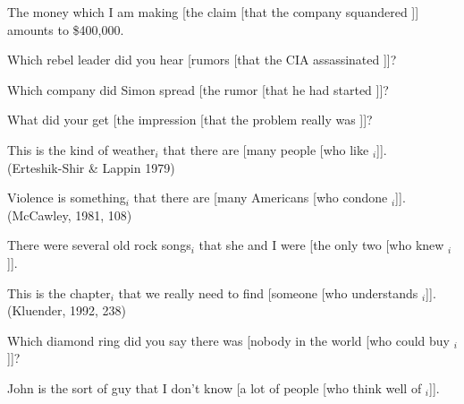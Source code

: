 \documentclass[output=paper]{langsci/langscibook}
\begin{document}

\ea \label{csubok}
\ea The money which I am making [the claim [that the company squandered \spc]] amounts to \$400,000.\\
 \citep[206, 207]{pollardsag}

\item  Which rebel leader did you hear [rumors [that the CIA assassinated \spc]]?
\item Which company did Simon spread [the rumor [that he had started \spc]]?
\item What did your get [the impression [that the problem really was \spc]]?\\
\citep{kluender}
\z
\z


\ea \label{csubok2}
\ea This is the kind of weather$_i$ that there are [many people [who like \spc$_i$]].\\
(Erteshik-Shir \& Lappin 1979)

\item Violence is something$_i$ that there are [many Americans [who condone \spc$_i$]].\\
(McCawley, 1981, 108)

\item There were several old rock songs$_i$ that she and I were [the only two [who
knew \spc$_i$]].\\
\citep{chungmc}

\item This is the chapter$_i$ that we really need to find [someone [who understands \spc$_i$]].\\
(Kluender, 1992, 238)

\item Which diamond ring did you say there was [nobody in the world [who could
buy \spc$_i$]]?\\
\citep[206]{pollardsag}

\item John is the sort of guy that I don't know [a lot of people [who think well of
\spc$_i$]].\\
\citep[230]{culicover99}
\z \label{rel}
\z
\end{document}
